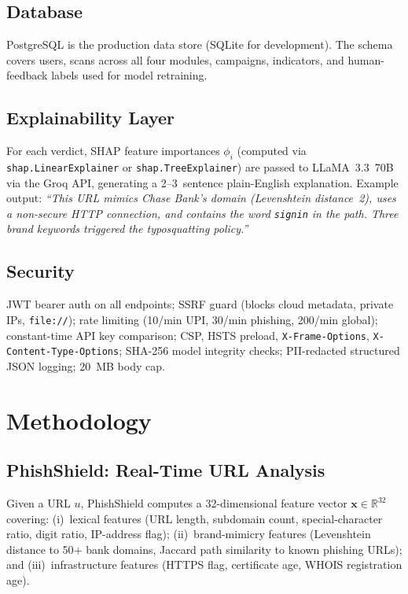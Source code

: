 \documentclass[conference]{IEEEtran}
\begin{document}
\subsection{Database}
PostgreSQL is the production data store (SQLite for development). The
schema covers users, scans across all four modules, campaigns,
indicators, and human-feedback labels used for model retraining.

\subsection{Explainability Layer}
For each verdict, SHAP feature importances $\phi_i$ (computed via
\texttt{shap.LinearExplainer} or \texttt{shap.TreeExplainer}) are
passed to LLaMA~3.3~70B via the Groq API, generating a 2--3~sentence
plain-English explanation. Example output: \textit{``This URL mimics
Chase Bank's domain (Levenshtein distance~2), uses a non-secure HTTP
connection, and contains the word \texttt{signin} in the path. Three
brand keywords triggered the typosquatting policy.''}

\subsection{Security}
JWT bearer auth on all endpoints; SSRF guard (blocks cloud metadata,
private IPs, \texttt{file://}); rate limiting (10/min UPI, 30/min
phishing, 200/min global); constant-time API key comparison; CSP, HSTS
preload, \texttt{X-Frame-Options}, \texttt{X-Content-Type-Options};
SHA-256 model integrity checks; PII-redacted structured JSON logging;
20~MB body cap.

\section{Methodology}

\subsection{PhishShield: Real-Time URL Analysis}
\vspace{2mm}
Given a URL $u$, PhishShield computes a 32-dimensional feature vector
$\mathbf{x}\!\in\!\mathbb{R}^{32}$ covering: (i)~lexical features
(URL length, subdomain count, special-character ratio, digit ratio,
IP-address flag); (ii)~brand-mimicry features (Levenshtein distance
to 50$+$ bank domains, Jaccard path similarity to known phishing
URLs); and (iii)~infrastructure features (HTTPS flag, certificate
age, WHOIS registration age).
\end{document}
